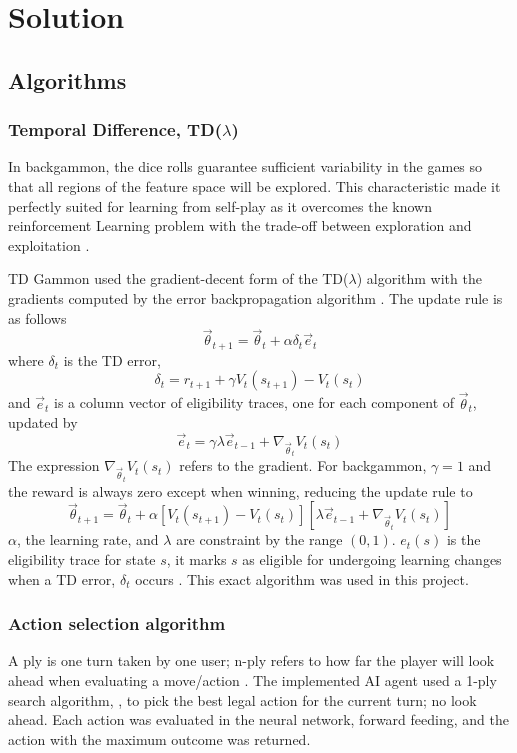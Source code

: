 \documentclass[12pt,a4paper]{article}
\begin{document}
\section{Solution}
\subsection{Algorithms}
\subsubsection{Temporal Difference, TD($\lambda$)}
In backgammon, the dice rolls guarantee sufficient variability in the games so that all regions of the feature space will be explored. This characteristic made it perfectly suited for learning from self-play as it overcomes the known reinforcement Learning problem with the trade-off between exploration and exploitation \cite{survey}. 

TD Gammon used the gradient-decent form of the TD($\lambda$) algorithm with the gradients computed by the error backpropagation algorithm \cite{rl}. The update rule is as follows
$$\vec{\theta}_{t+1} = \vec{\theta}_{t} + \alpha\delta_t\vec{e}_{t}$$ 
where $\delta_t$ is the TD error,
$$\delta_{t} = r_{t+1} + \gamma V_t(s_{t+1}) - V_t(s_t)$$ 
and $\vec{e}_t$ is a column vector of eligibility traces, one for each component of $\vec{\theta}_t$, updated by 
$$\vec{e}_{t} = \gamma\lambda\vec{e}_{t-1} + \nabla_{\vec{\theta}_{t}}V_t(s_t)$$ 
The expression $\nabla_{\vec{\theta}_{t}}V_t(s_t)$ refers to the gradient. For backgammon, $\gamma=1$ and the reward is always zero except when winning, reducing the update rule to
$$\vec{\theta}_{t+1} = \vec{\theta}_{t} + \alpha[V_t(s_{t+1}) - V_t(s_t)][\lambda\vec{e}_{t-1} + \nabla_{\vec{\theta}_{t}}V_t(s_t)]$$
$\alpha$, the learning rate, and $\lambda$ are constraint by the range $(0,1)$. $e_t(s)$ is the eligibility trace for state $s$, it marks $s$ as eligible for undergoing learning changes when a TD error, $\delta_t$ occurs \cite{rl}. This exact algorithm was used in this project.

\subsubsection{Action selection algorithm}
A ply is one turn taken by one user; n-ply refers to how far the player will look ahead when evaluating a move/action \cite{glossary}. The implemented AI agent used a 1-ply search algorithm, \cite{DBLP:conf/icml/Tesauro92}, to pick the best legal action for the current turn; no look ahead. Each action was evaluated in the neural network, forward feeding, and the action with the maximum outcome was returned. 
\end{document}
